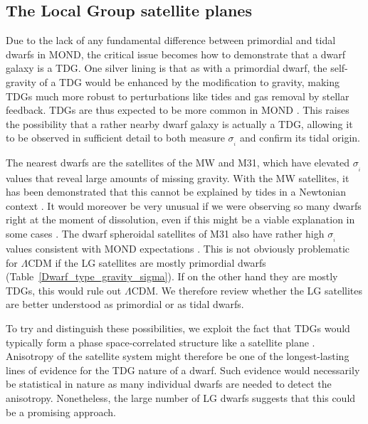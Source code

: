 \documentclass[fleqn,usenatbib,useAMS,onecolumn]{mnras} %
\begin{document}
\subsection{The Local Group satellite planes}
\label{Local_Group_satellite_planes}

Due to the lack of any fundamental difference between primordial and tidal dwarfs in MOND, the critical issue becomes how to demonstrate that a dwarf galaxy is a TDG. One silver lining is that as with a primordial dwarf, the self-gravity of a TDG would be enhanced by the modification to gravity, making TDGs much more robust to perturbations like tides and gas removal by stellar feedback. TDGs are thus expected to be more common in MOND \citep[as shown with numerical simulations;][]{Renaud_2016}. This raises the possibility that a rather nearby dwarf galaxy is actually a TDG, allowing it to be observed in sufficient detail to both measure $\sigma_{_i}$ and confirm its tidal origin.

The nearest dwarfs are the satellites of the MW and M31, which have elevated $\sigma_{_i}$ values that reveal large amounts of missing gravity. With the MW satellites, it has been demonstrated that this cannot be explained by tides in a Newtonian context \citep{McGaugh_Wolf_2010}. It would moreover be very unusual if we were observing so many dwarfs right at the moment of dissolution, even if this might be a viable explanation in some cases \citep{Kroupa_1997, Klessen_1998}. The dwarf spheroidal satellites of M31 also have rather high $\sigma_{_i}$ values consistent with MOND expectations \citep{McGaugh_2013a, McGaugh_2013b}. This is not obviously problematic for $\Lambda$CDM if the LG satellites are mostly primordial dwarfs (Table~\ref{Dwarf_type_gravity_sigma}). If on the other hand they are mostly TDGs, this would rule out $\Lambda$CDM. We therefore review whether the LG satellites are better understood as primordial or as tidal dwarfs.

To try and distinguish these possibilities, we exploit the fact that TDGs would typically form a phase space-correlated structure like a satellite plane \citep{Pawlowski_2011, Haslbauer_2019}. Anisotropy of the satellite system might therefore be one of the longest-lasting lines of evidence for the TDG nature of a dwarf. Such evidence would necessarily be statistical in nature as many individual dwarfs are needed to detect the anisotropy. Nonetheless, the large number of LG dwarfs \citep[e.g.][]{McConnachie_2012} suggests that this could be a promising approach.
\end{document}
